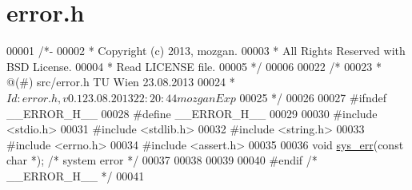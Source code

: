 \hypertarget{error_8h_source}{\section{error.\+h}
\label{error_8h_source}
}

\begin{DoxyCode}
00001 \textcolor{comment}{/*-}
00002 \textcolor{comment}{ * Copyright (c) 2013, mozgan.}
00003 \textcolor{comment}{ * All Rights Reserved with BSD License.}
00004 \textcolor{comment}{ * Read LICENSE file.}
00005 \textcolor{comment}{ */}
00006 
00022 \textcolor{comment}{/*}
00023 \textcolor{comment}{ *      @(#) src/error.h                TU Wien 23.08.2013}
00024 \textcolor{comment}{ *  $Id: error.h,v 0.1 23.08.2013 22:20:44 mozgan Exp $}
00025 \textcolor{comment}{ */}
00026 
00027 \textcolor{preprocessor}{#ifndef \_\_ERROR\_H\_\_}
00028 \textcolor{preprocessor}{#define \_\_ERROR\_H\_\_}
00029 
00030 \textcolor{preprocessor}{#include <stdio.h>}
00031 \textcolor{preprocessor}{#include <stdlib.h>}
00032 \textcolor{preprocessor}{#include <string.h>}
00033 \textcolor{preprocessor}{#include <errno.h>}
00034 \textcolor{preprocessor}{#include <assert.h>}
00035 
00036 \textcolor{keywordtype}{void}            \hyperlink{error_8h_a7c50c1dd9ff2f0d7d88bef6a99b4315c}{sys\_err}(\textcolor{keyword}{const} \textcolor{keywordtype}{char} *);   \textcolor{comment}{/* system error */}
00037 
00038 
00039 
00040 \textcolor{preprocessor}{#endif }\textcolor{comment}{/* \_\_ERROR\_H\_\_ */}\textcolor{preprocessor}{}
00041 
\end{DoxyCode}
